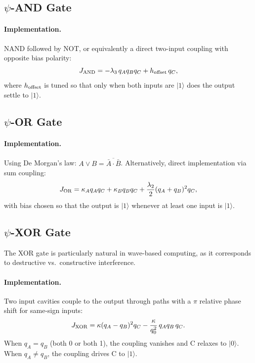 \documentclass[12pt,a4paper,twoside]{article}
\begin{document}
\subsection{$\psi$-AND Gate}\label{sec:and_gate}

\paragraph{Implementation.} NAND followed by NOT, or equivalently a direct two-input coupling with opposite bias polarity:
\begin{equation}
J_{\rm AND} = -\lambda_3\,q_A q_B q_C + h_{\rm offset}\,q_C,
\end{equation}
where $h_{\rm offset}$ is tuned so that only when both inputs are $|1\rangle$ does the output settle to $|1\rangle$.

\subsection{$\psi$-OR Gate}\label{sec:or_gate}

\paragraph{Implementation.} Using De Morgan's law: $A \vee B = \overline{\bar{A} \cdot \bar{B}}$. Alternatively, direct implementation via sum coupling:
\begin{equation}
J_{\rm OR} = \kappa_A q_A q_C + \kappa_B q_B q_C + \frac{\lambda_2}{2}(q_A + q_B)^2 q_C,
\end{equation}
with bias chosen so that the output is $|1\rangle$ whenever at least one input is $|1\rangle$.

\subsection{$\psi$-XOR Gate}\label{sec:xor_gate}

The XOR gate is particularly natural in wave-based computing, as it corresponds to destructive vs.\ constructive interference.

\paragraph{Implementation.} Two input cavities couple to the output through paths with a $\pi$ relative phase shift for same-sign inputs:
\begin{equation}
J_{\rm XOR} = \kappa(q_A - q_B)^2 q_C - \frac{\kappa}{q_0^2}\,q_A q_B\,q_C.
\label{eq:xor_coupling}
\end{equation}
When $q_A = q_B$ (both 0 or both 1), the coupling vanishes and C relaxes to $|0\rangle$. When $q_A \neq q_B$, the coupling drives C to $|1\rangle$.
\end{document}
